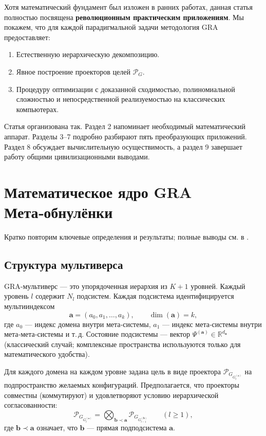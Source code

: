 \documentclass[11pt,a4paper]{article}
\theoremstyle{definition}
\newcommand{\pG}{\mathcal{P}_{\!G}}
\begin{document}
Хотя математический фундамент был изложен в ранних работах, данная статья полностью посвящена \textbf{революционным практическим приложениям}. Мы покажем, что для каждой парадигмальной задачи методология GRA предоставляет:
\begin{enumerate}
    \item Естественную иерархическую декомпозицию.
    \item Явное построение проекторов целей $\pG$.
    \item Процедуру оптимизации с доказанной сходимостью, полиномиальной сложностью и непосредственной реализуемостью на классических компьютерах.
\end{enumerate}
Статья организована так. Раздел 2 напоминает необходимый математический аппарат. Разделы 3–7 подробно разбирают пять преобразующих приложений. Раздел 8 обсуждает вычислительную осуществимость, а раздел 9 завершает работу общими цивилизационными выводами.

\section{Математическое ядро GRA Мета‑обнулёнки}
\label{sec:math}

Кратко повторим ключевые определения и результаты; полные выводы см. в \cite{gra-orig}.

\subsection{Структура мультиверса}

GRA-мультиверс — это упорядоченная иерархия из $K+1$ уровней. Каждый уровень $l$ содержит $N_l$ подсистем. Каждая подсистема идентифицируется мультииндексом
\[
\mathbf{a} = (a_0, a_1, \dots, a_k),\qquad \dim(\mathbf{a})=k,
\]
где $a_0$ — индекс домена внутри мета‑системы, $a_1$ — индекс мета‑системы внутри мета‑мета‑системы и т. д.
Состояние подсистемы — вектор $\Psi^{(\mathbf{a})}\in\mathbb{R}^{d_{\mathbf{a}}}$ (классический случай; комплексные пространства используются только для математического удобства).

Для каждого домена на каждом уровне задана цель в виде проектора $\pG_{G_l^{(\mathbf{a})}}$ на подпространство желаемых конфигураций. Предполагается, что проекторы совместны (коммутируют) и удовлетворяют условию иерархической согласованности:
\[
\pG_{G_l^{(\mathbf{a})}} = \bigotimes_{\mathbf{b}\prec\mathbf{a}} \pG_{G_{l-1}^{(\mathbf{b})}} \qquad (l\ge 1),
\]
где $\mathbf{b}\prec\mathbf{a}$ означает, что $\mathbf{b}$ — прямая подподсистема $\mathbf{a}$.
\end{document}
